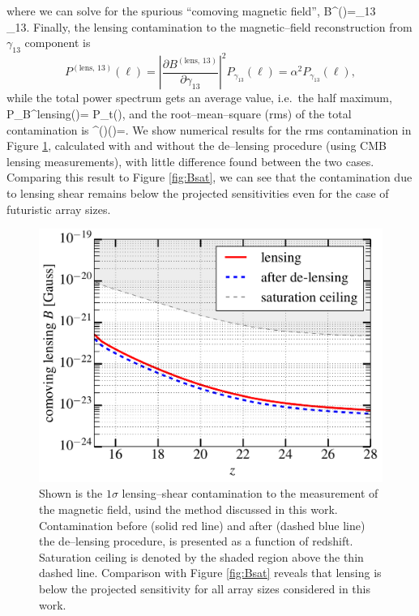 where we can solve for the spurious ``comoving magnetic field'',
\beq
\bga
B^{()}=\gamma_{13}\nonumber\\
\equiv\alpha\gamma_{13}.
\ega
\eeq
Finally, the lensing contamination to the magnetic--field reconstruction from $\gamma_{13}$ component is
\begin{equation}
P^{(\text{lens, 13})}(\ell)=\left\vert\frac{\partial B^{(\text{lens, 13})}}{\partial\gamma_{13}}\right\vert^2 P_{\gamma_{13}}(\ell)=\alpha^2 P_{\gamma_{13}}(\ell),
\end{equation}
while the total power spectrum gets an average value, i.e.~the half maximum,
\beq
P_B^{\rm lensing}(\ell)= P_t(\ell),
\eeq
and the root--mean--square (rms) of the total contamination is
\beq
\Delta^{()}(\ell)=.
\eeq
We show numerical results for the rms contamination in Figure \ref{fig:lensing_B}, calculated with and without the de--lensing procedure (using CMB lensing measurements), with little difference found between the two cases. Comparing this result to Figure \ref{fig:Bsat}, we can see that the contamination due to lensing shear remains below the projected sensitivities even for the case of futuristic array sizes.
\begin{figure}[h]
\centering
\includegraphics[scale=0.4]{delensingB.pdf}
\caption{Shown is the $1\sigma$ lensing--shear contamination to the measurement of the magnetic field, usind the method discussed in this work. Contamination before (solid red line) and after (dashed blue line) the de--lensing procedure, is presented as a function of redshift. Saturation ceiling is denoted by the shaded region above the thin dashed line. Comparison with Figure \ref{fig:Bsat} reveals that lensing is below the projected sensitivity for all array sizes considered in this work.}
\label{fig:lensing_B}
\end{figure}
